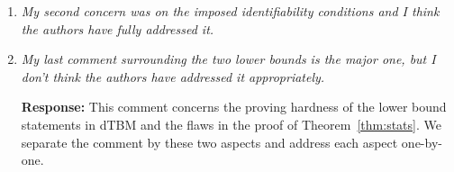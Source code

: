\documentclass[11pt]{article}
\theoremstyle{definition}
\theoremstyle{definition}
\begin{document}
\begin{enumerate}
\begin{enumerate}[wide]
\begin{quote}
        \end{quote}
        
        
        
        

    \end{enumerate}
    
    \item \textit{My second concern was on the imposed identifiability conditions and I think the authors have fully addressed it.}
    
    \item \textit{My last comment surrounding the two lower bounds is the major one, but I don’t think the authors have addressed it appropriately. }
    
    \textbf{Response:} This comment concerns the proving hardness of the lower bound statements in dTBM and the flaws in the proof of Theorem~\ref{thm:stats}. We separate the comment by these two aspects and address each aspect one-by-one.
    

\end{enumerate}
\end{document}
